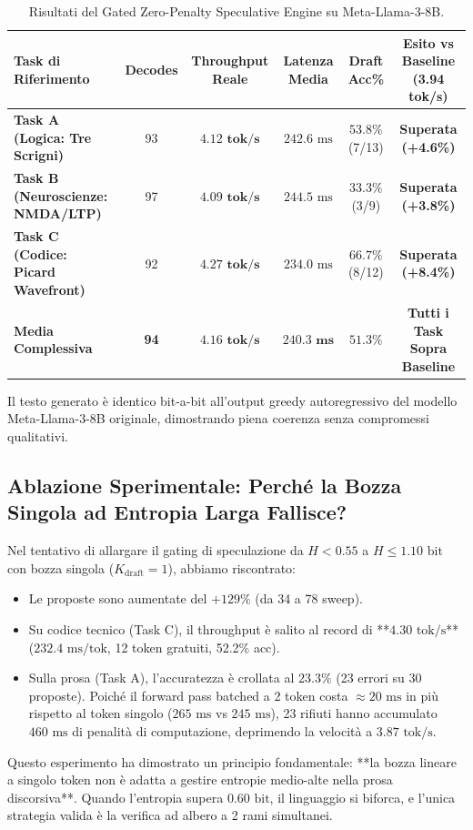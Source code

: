 \documentclass[10pt,a4paper]{article}
\theoremstyle{definition}
\begin{document}
\begin{table}[htbp]
\centering
\small
\caption{Risultati del Gated Zero-Penalty Speculative Engine su Meta-Llama-3-8B.}
\label{tab:spec_results}
\begin{tabular}{lccccc}
\toprule
\textbf{Task di Riferimento} & \textbf{Decodes} & \textbf{Throughput Reale} & \textbf{Latenza Media} & \textbf{Draft Acc\%} & \textbf{Esito vs Baseline (3.94 tok/s)} \\
\midrule
\textbf{Task A (Logica: Tre Scrigni)} & 93 & $\mathbf{4.12\text{ tok/s}}$ & $242.6\text{ ms}$ & $53.8\%$ (7/13) & \textbf{Superata (+4.6\%)} \\
\textbf{Task B (Neuroscienze: NMDA/LTP)} & 97 & $\mathbf{4.09\text{ tok/s}}$ & $244.5\text{ ms}$ & $33.3\%$ (3/9) & \textbf{Superata (+3.8\%)} \\
\textbf{Task C (Codice: Picard Wavefront)} & 92 & $\mathbf{4.27\text{ tok/s}}$ & $234.0\text{ ms}$ & $66.7\%$ (8/12) & \textbf{Superata (+8.4\%)} \\
\midrule
\textbf{Media Complessiva} & \textbf{94} & $\mathbf{4.16\text{ tok/s}}$ & $\mathbf{240.3\text{ ms}}$ & $\mathbf{51.3\%}$ & \textbf{Tutti i Task Sopra Baseline} \\
\bottomrule
\end{tabular}
\end{table}

\noindent Il testo generato \`e identico bit-a-bit all'output greedy autoregressivo del modello Meta-Llama-3-8B originale, dimostrando piena coerenza senza compromessi qualitativi.

\subsection{Ablazione Sperimentale: Perché la Bozza Singola ad Entropia Larga Fallisce?}
Nel tentativo di allargare il gating di speculazione da $H < 0.55$ a $H \le 1.10\text{ bit}$ con bozza singola ($K_{\text{draft}}=1$), abbiamo riscontrato:
\begin{itemize}[leftmargin=1.5em]
    \item Le proposte sono aumentate del $+129\%$ (da 34 a 78 sweep).
    \item Su codice tecnico (Task C), il throughput \`e salito al record di **$4.30\text{ tok/s}$** ($232.4\text{ ms/tok}$, 12 token gratuiti, 52.2\% acc).
    \item Sulla prosa (Task A), l'accuratezza \`e crollata al $23.3\%$ (23 errori su 30 proposte). Poich\'e il forward pass batched a 2 token costa $\approx 20\text{ ms}$ in pi\`u rispetto al token singolo ($265\text{ ms}$ vs $245\text{ ms}$), 23 rifiuti hanno accumulato $460\text{ ms}$ di penalit\`a di computazione, deprimendo la velocit\`a a $3.87\text{ tok/s}$.
\end{itemize}
Questo esperimento ha dimostrato un principio fondamentale: **la bozza lineare a singolo token non \`e adatta a gestire entropie medio-alte nella prosa discorsiva**. Quando l'entropia supera $0.60\text{ bit}$, il linguaggio si biforca, e l'unica strategia valida \`e la verifica ad albero a 2 rami simultanei.
\end{document}
